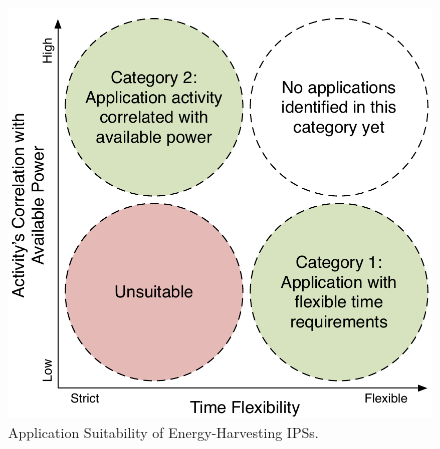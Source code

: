 \begin{figure}
    \centering
    \includegraphics[width=0.8\columnwidth]{ch1_intro/figures/appsuit2}
    \caption{Application Suitability of Energy-Harvesting IPSs.}
    \label{fig:appsuit}
\end{figure}


